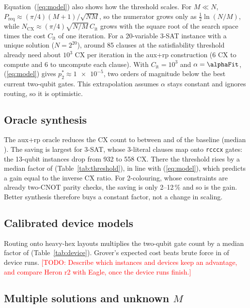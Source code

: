 \documentclass[conference]{IEEEtran}
\newcommand{\todo}[1]{\textcolor{red}{[TODO: #1]}}
\begin{document}
Equation~(\ref{eq:model}) also shows how the threshold scales. For $M\ll N$, $P_\text{req}\approx(\pi/4)(M+1)/\sqrt{NM}$, so the numerator grows only as $\tfrac12\ln(N/M)$, while $N_\text{CX}\approx(\pi/4)\sqrt{N/M}\,C_\text{it}$ grows with the square root of the search space times the cost $C_\text{it}$ of one iteration. For a 20-variable 3-SAT instance with a unique solution ($N=2^{20}$), around 85 clauses at the satisfiability threshold already need about $10^3$ CX per iteration in the aux+rp construction (6 CX to compute and 6 to uncompute each clause). With $C_\text{it}=10^3$ and $\alpha=\alphaFit$, (\ref{eq:model}) gives $p_2^*\approx\num{1e-5}$, two orders of magnitude below the best current two-qubit gates. This extrapolation assumes $\alpha$ stays constant and ignores routing, so it is optimistic.

\subsection{Oracle synthesis}

The aux+rp oracle reduces the CX count to between \cxRatioMin{} and \cxRatioMax{} of the baseline (median \cxRatioMed). The saving is largest for 3-SAT, whose 3-literal clauses map onto \texttt{rcccx} gates: the 13-qubit instances drop from 932 to 558 CX. There the threshold rises by a median factor of \gainSatMed{} (Table~\ref{tab:threshold}), in line with (\ref{eq:model}), which predicts a gain equal to the inverse CX ratio. For 2-colouring, whose constraints are already two-CNOT parity checks, the saving is only 2--12\,\% and so is the gain. Better synthesis therefore buys a constant factor, not a change in scaling.

\subsection{Calibrated device models}



Routing onto heavy-hex layouts multiplies the two-qubit gate count by a median factor of \routeOverhead{} (Table~\ref{tab:device}). Grover's expected cost beats brute force in \deviceAdvantage{} of \deviceRuns{} device runs. \todo{Describe which instances and devices keep an advantage, and compare Heron r2 with Eagle, once the device runs finish.}

\subsection{Multiple solutions and unknown $M$}
\end{document}
